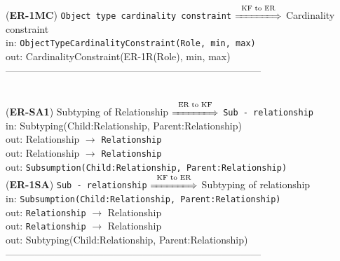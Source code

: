 \documentclass[sn-mathphys]{sn-jnl}
\begin{document}
{{{({\bf ER-1MC}) {\tt Object type cardinality constraint} $\overset{\text{KF to ER}}{\xLongrightarrow{\hspace*{1.4cm}}}$ {Cardinality constraint}\\
\hspace*{0.3cm}in: {\tt ObjectTypeCardinalityConstraint(Role, min, max)} \\
\hspace*{0.5cm}out:  {CardinalityConstraint(ER-1R(Role), min, max)}\\

------------------------------------------------------------------------------
\\ \

({\bf ER-SA1}) {Subtyping of Relationship} $\overset{\text{ER to KF}}{\xLongrightarrow{\hspace*{1.4cm}}}$ {\tt Sub - relationship}\\
\hspace*{0.3cm}in: {Subtyping(Child:Relationship, Parent:Relationship)} \\
\hspace*{0.5cm}out:  {Relationship} $\rightarrow$ {\tt Relationship }\\
\hspace*{0.5cm}out:  {Relationship} $\rightarrow$ {\tt Relationship }\\
\hspace*{0.5cm}out:  {\tt Subsumption(Child:Relationship, Parent:Relationship)}\\

({\bf ER-1SA}) {\tt Sub - relationship} $\overset{\text{KF to ER}}{\xLongrightarrow{\hspace*{1.4cm}}}$ {Subtyping of relationship}\\
\hspace*{0.3cm}in: {\tt Subsumption(Child:Relationship, Parent:Relationship)} \\
\hspace*{0.5cm}out:  {\tt Relationship} $\rightarrow$ {Relationship }\\
\hspace*{0.5cm}out:  {\tt Relationship} $\rightarrow$ {Relationship }\\
\hspace*{0.5cm}out:  {Subtyping(Child:Relationship, Parent:Relationship)}\\

------------------------------------------------------------------------------
\\ \

}}}
\end{document}

